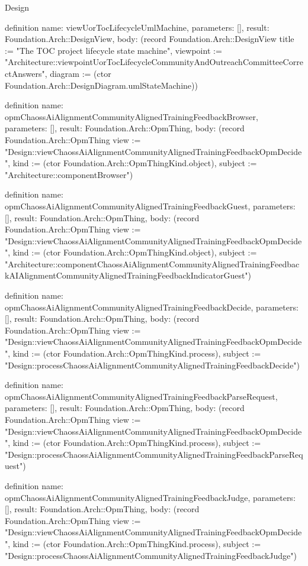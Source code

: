 \begin{lexlean}{Design}
\begin{semanticmodule}
definition{
  name: viewUorTocLifecycleUmlMachine,
  parameters: [],
  result: Foundation.Arch::DesignView,
  body: (record Foundation.Arch::DesignView {title := "The TOC project lifecycle state machine", viewpoint := "Architecture::viewpointUorTocLifecycleCommunityAndOutreachCommitteeCorrectAnswers", diagram := (ctor Foundation.Arch::DesignDiagram.umlStateMachine)})
}

definition{
  name: opmChaossAiAlignmentCommunityAlignedTrainingFeedbackBrowser,
  parameters: [],
  result: Foundation.Arch::OpmThing,
  body: (record Foundation.Arch::OpmThing {view := "Design::viewChaossAiAlignmentCommunityAlignedTrainingFeedbackOpmDecide", kind := (ctor Foundation.Arch::OpmThingKind.object), subject := "Architecture::componentBrowser"})
}

definition{
  name: opmChaossAiAlignmentCommunityAlignedTrainingFeedbackGuest,
  parameters: [],
  result: Foundation.Arch::OpmThing,
  body: (record Foundation.Arch::OpmThing {view := "Design::viewChaossAiAlignmentCommunityAlignedTrainingFeedbackOpmDecide", kind := (ctor Foundation.Arch::OpmThingKind.object), subject := "Architecture::componentChaossAiAlignmentCommunityAlignedTrainingFeedbackAIAlignmentCommunityAlignedTrainingFeedbackIndicatorGuest"})
}

definition{
  name: opmChaossAiAlignmentCommunityAlignedTrainingFeedbackDecide,
  parameters: [],
  result: Foundation.Arch::OpmThing,
  body: (record Foundation.Arch::OpmThing {view := "Design::viewChaossAiAlignmentCommunityAlignedTrainingFeedbackOpmDecide", kind := (ctor Foundation.Arch::OpmThingKind.process), subject := "Design::processChaossAiAlignmentCommunityAlignedTrainingFeedbackDecide"})
}

definition{
  name: opmChaossAiAlignmentCommunityAlignedTrainingFeedbackParseRequest,
  parameters: [],
  result: Foundation.Arch::OpmThing,
  body: (record Foundation.Arch::OpmThing {view := "Design::viewChaossAiAlignmentCommunityAlignedTrainingFeedbackOpmDecide", kind := (ctor Foundation.Arch::OpmThingKind.process), subject := "Design::processChaossAiAlignmentCommunityAlignedTrainingFeedbackParseRequest"})
}

definition{
  name: opmChaossAiAlignmentCommunityAlignedTrainingFeedbackJudge,
  parameters: [],
  result: Foundation.Arch::OpmThing,
  body: (record Foundation.Arch::OpmThing {view := "Design::viewChaossAiAlignmentCommunityAlignedTrainingFeedbackOpmDecide", kind := (ctor Foundation.Arch::OpmThingKind.process), subject := "Design::processChaossAiAlignmentCommunityAlignedTrainingFeedbackJudge"})
}


\end{semanticmodule}
\end{lexlean}
